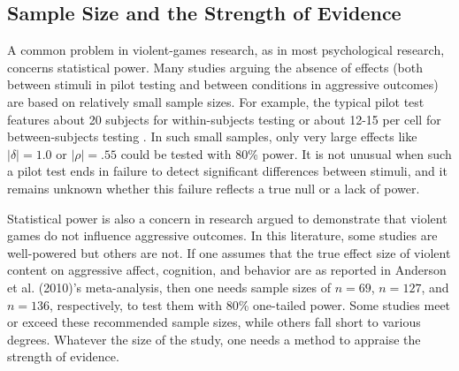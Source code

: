 \documentclass[man]{apa6}
\begin{document}
\subsection{Sample Size and the Strength of Evidence}
A common problem in violent-games research, as in most psychological research, concerns statistical power. Many studies arguing the absence of effects (both between stimuli in pilot testing and between conditions in aggressive outcomes) are based on relatively small sample sizes.   For example, the typical pilot test features about 20 subjects for within-subjects testing \citep[e.g.,][]{Arriaga:etal:2008} or about 12-15 per cell for between-subjects testing \citep[e.g.,][]{Anderson:etal:2004,Valadez:Ferguson:2012}. In such small samples, only very large effects like $|\delta| = 1.0$ or $|\rho| = .55$ could be tested with 80\% power. It is not unusual when such a pilot test ends in failure to detect significant differences between stimuli, and it remains unknown whether this failure reflects a true null or a lack of power.

Statistical power is also a concern in research argued to demonstrate that violent games do not influence aggressive outcomes. In this literature, some studies are well-powered but others are not. If one assumes that the true effect size of violent content on aggressive affect, cognition, and behavior are as reported in Anderson et al. (2010)'s meta-analysis, then one needs sample sizes of $n = 69$, $n = 127$, and $n = 136$, respectively, to test them with 80\% one-tailed power. Some studies meet or exceed these recommended sample sizes, while others fall short to various degrees. Whatever the size of the study, one needs a method to appraise the strength of evidence.
\end{document}
